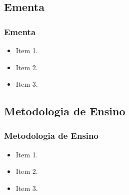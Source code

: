 \subsection[Ementa]{Ementa}\label{subsec:ementa-ementa}



\begin{frame}[t]\frametitle{Ementa}

  \begin{itemize}
    \justifying{}
    \setlength\itemsep{1em}
    \item Item 1.
    \item Item 2.
    \item Item 3.
  \end{itemize}

\end{frame}



\subsection[Metodologia de Ensino]{Metodologia de Ensino}\label{subsec:ementa-metodologia-ensino}



\begin{frame}[t]\frametitle{Metodologia de Ensino}

  \begin{itemize}
    \justifying{}
    \setlength\itemsep{1em}
    \item Item 1.
    \item Item 2.
    \item Item 3.
  \end{itemize}

\end{frame}



